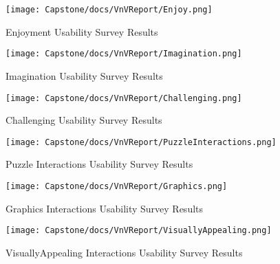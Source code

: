 \documentclass[12pt, titlepage]{article}
\begin{document}
\begin{figure}[htbp]
\caption{Enjoyment Usability Survey Results}
\centerline{\texttt{[image: Capstone/docs/VnVReport/Enjoy.png]}}
\label{fig:Enjoy}
\end{figure}

\begin{figure}[htbp]
\caption{Imagination Usability Survey Results}
\centerline{\texttt{[image: Capstone/docs/VnVReport/Imagination.png]}}
\label{fig:Imagination}
\end{figure}

\begin{figure}[htbp]
\caption{Challenging Usability Survey Results}
\centerline{\texttt{[image: Capstone/docs/VnVReport/Challenging.png]}}
\label{fig:Challenging}
\end{figure}

\begin{figure}[htbp]
\caption{Puzzle Interactions Usability Survey Results}
\centerline{\texttt{[image: Capstone/docs/VnVReport/PuzzleInteractions.png]}}
\label{fig:PuzzleInteractions}
\end{figure}

\begin{figure}[htbp]
\caption{Graphics Interactions Usability Survey Results}
\centerline{\texttt{[image: Capstone/docs/VnVReport/Graphics.png]}}
\label{fig:Graphics}
\end{figure}

\begin{figure}[htbp]
\caption{VisuallyAppealing Interactions Usability Survey Results}
\centerline{\texttt{[image: Capstone/docs/VnVReport/VisuallyAppealing.png]}}
\label{fig:VisuallyAppealing}
\end{figure}
\end{document}
